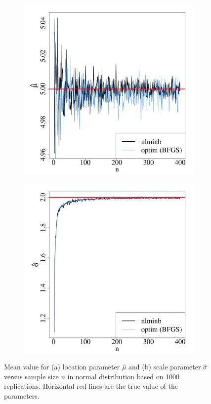 \documentclass[nojss]{jss}
\begin{document}
\begin{figure}[H]
    \begin{subfigure}[h]{0.49\textwidth}
        \includegraphics[width=\textwidth]{article-norm_a}
        \caption{\label{fig:norma}}
    \end{subfigure}
    \begin{subfigure}[h]{0.49\textwidth}
        \includegraphics[width=\textwidth]{article-norm_b}
        \caption{\label{fig:normb}}
    \end{subfigure}
\caption{\label{fig:norm} Mean value for (a) location parameter $\hat{\mu}$ and (b) scale parameter $\hat{\sigma}$ versus sample size $n$ in normal distribution based on 1000 replications. Horizontal red lines are the true value of the parameters.}
\end{figure}
\end{document}
